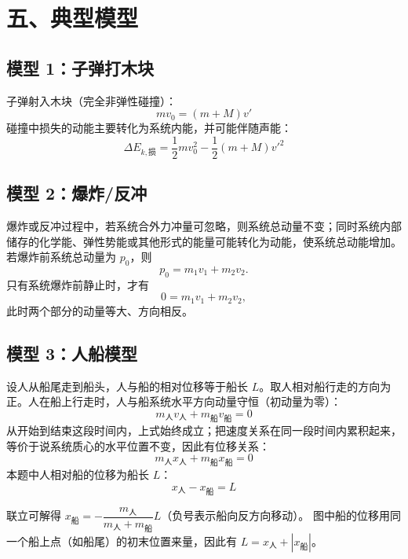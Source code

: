 \section*{五、典型模型}

\subsection*{模型 1：子弹打木块}

子弹射入木块（完全非弹性碰撞）：
\[
m v_0 = (m + M) v'
\]
碰撞中损失的动能主要转化为系统内能，并可能伴随声能：
\[
\Delta E_{k,\text{损}} = \frac12 m v_0^2 - \frac12 (m+M) v'^2
\]

\subsection*{模型 2：爆炸/反冲}

爆炸或反冲过程中，若系统合外力冲量可忽略，则系统总动量不变；同时系统内部储存的化学能、弹性势能或其他形式的能量可能转化为动能，使系统总动能增加。若爆炸前系统总动量为 $p_0$，则
\[
p_0=m_1v_1+m_2v_2.
\]
只有系统爆炸前静止时，才有
\[
0=m_1v_1+m_2v_2,
\]
此时两个部分的动量等大、方向相反。

\begin{center}


\label{fig:momentum-recoil-explosion}
\end{center}

\subsection*{模型 3：人船模型}

设人从船尾走到船头，人与船的相对位移等于船长 $L$。取人相对船行走的方向为正。人在船上行走时，人与船系统水平方向动量守恒（初动量为零）：
\[
m_{\text{人}} v_{\text{人}} + m_{\text{船}} v_{\text{船}} = 0
\]
从开始到结束这段时间内，上式始终成立；把速度关系在同一段时间内累积起来，等价于说系统质心的水平位置不变，因此有位移关系：
\[
m_{\text{人}} x_{\text{人}} + m_{\text{船}} x_{\text{船}} = 0
\]
本题中人相对船的位移为船长 $L$：
\[
x_{\text{人}} - x_{\text{船}} = L
\]

联立可解得 $x_{\text{船}} = -\dfrac{m_{\text{人}}}{m_{\text{人}}+m_{\text{船}}} L$（负号表示船向反方向移动）。
图中船的位移用同一个船上点（如船尾）的初末位置来量，因此有
$L=x_{\text{人}}+|x_{\text{船}}|$。

\begin{center}


\label{fig:human-boat-model}
\end{center}

